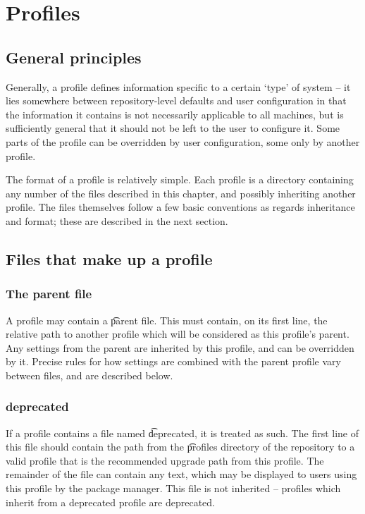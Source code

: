\chapter{Profiles}
\label{profiles}

\section{General principles}
Generally, a profile defines information specific to a certain `type' of system -- it lies somewhere
between repository-level defaults and user configuration in that the information it contains is not
necessarily applicable to all machines, but is sufficiently general that it should not be left to
the user to configure it. Some parts of the profile can be overridden by user configuration, some
only by another profile.

The format of a profile is relatively simple. Each profile is a directory containing any number of
the files described in this chapter, and possibly inheriting another profile. The files themselves
follow a few basic conventions as regards inheritance and format; these are described in the next
section.

\section{Files that make up a profile}
\subsection{The parent file}
A profile may contain a \t{parent} file. This must contain, on its first line, the relative path to
another profile which will be considered as this profile's parent. Any settings from the parent are
inherited by this profile, and can be overridden by it. Precise rules for how settings are combined
with the parent profile vary between files, and are described below.

\subsection{deprecated}
If a profile contains a file named \t{deprecated}, it is treated as such. The first line of this
file should contain the path from the \t{profiles} directory of the repository to a valid profile
that is the recommended upgrade path from this profile. The remainder of the file can contain any
text, which may be displayed to users using this profile by the package manager. This file is not
inherited -- profiles which inherit from a deprecated profile are  deprecated.

